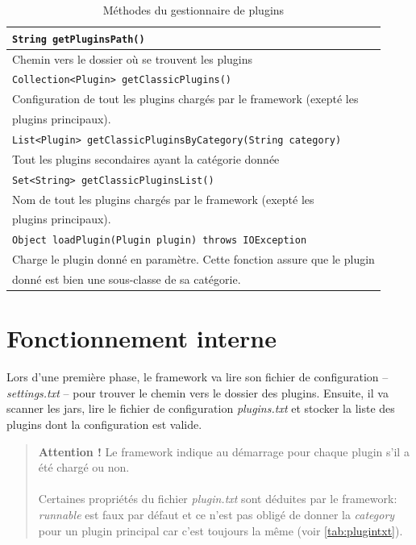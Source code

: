 \documentclass[12pt,a4paper]{article}
\begin{document}
\begin{table}[h]
	\begin{tabular}{|l|}
		\hline
		\texttt{String getPluginsPath()}\\
		\hline
		Chemin vers le dossier où se trouvent les plugins\\
		\hline			

		\hline
		\texttt{Collection<Plugin> getClassicPlugins()}\\
		\hline
		Configuration de tout les plugins chargés par le framework (exepté les\\ 
		plugins	principaux).\\
		\hline
	
		\hline
		\texttt{List<Plugin> getClassicPluginsByCategory(String category)}\\
		\hline
		Tout les plugins secondaires ayant la catégorie donnée\\
		\hline

		\hline
		\texttt{Set<String> getClassicPluginsList()}\\
		\hline
		Nom de tout les plugins chargés par le framework (exepté les \\
		plugins	principaux).\\
		\hline
			
		\hline
		\texttt{Object loadPlugin(Plugin plugin) throws IOException}\\
		\hline
		Charge le plugin donné en paramètre. Cette fonction assure que le plugin\\
		donné est bien une sous-classe de sa catégorie.\\
		\hline
	\end{tabular}	
\caption{Méthodes du gestionnaire de plugins}
\end{table}

\section{Fonctionnement interne}
Lors d'une première phase, le framework va lire son fichier de configuration -- 
\emph{settings.txt} -- pour trouver le chemin vers le dossier des plugins. 
Ensuite, il va scanner les jars, lire le fichier de configuration 
\emph{plugins.txt} et stocker la liste des plugins dont la configuration est valide.

\begin{quote}
	\textbf{Attention !} Le framework indique au démarrage pour chaque plugin 
	s'il a été chargé ou non. 
	\\\\
	Certaines propriétés du fichier \emph{plugin.txt} sont déduites par le 
	framework: \emph{runnable} est faux par défaut et ce n'est pas obligé de 
	donner la \emph{category} pour un plugin principal car c'est toujours la 
	même (voir \ref{tab:plugintxt}).
\end{quote}
\end{document}
